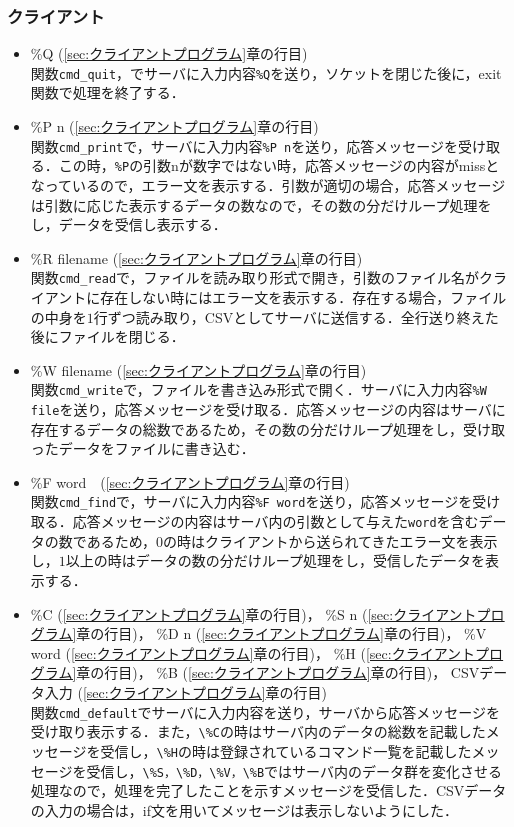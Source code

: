 \documentclass{jarticle}[11pt]
\begin{document}
\subsubsection{クライアント}
\begin{itemize}
\item \%Q (\ref{sec:クライアントプログラム}章の行目)\\
  関数\verb|cmd_quit|，でサーバに入力内容\verb|%Q|を送り，ソケットを閉じた後に，exit関数で処理を終了する．

\item \%P n (\ref{sec:クライアントプログラム}章の行目)\\
  関数\verb|cmd_print|で，サーバに入力内容\verb|%P n|を送り，応答メッセージを受け取る．この時，\verb|%P|の引数nが数字ではない時，応答メッセージの内容がmissとなっているので，エラー文を表示する．引数が適切の場合，応答メッセージは引数に応じた表示するデータの数なので，その数の分だけループ処理をし，データを受信し表示する．

\item \%R filename (\ref{sec:クライアントプログラム}章の行目)\\
関数\verb|cmd_read|で，ファイルを読み取り形式で開き，引数のファイル名がクライアントに存在しない時にはエラー文を表示する．存在する場合，ファイルの中身を$1$行ずつ読み取り，CSVとしてサーバに送信する．全行送り終えた後にファイルを閉じる．

\item \%W filename (\ref{sec:クライアントプログラム}章の行目)\\
関数\verb|cmd_write|で，ファイルを書き込み形式で開く．サーバに入力内容\verb|%W file|を送り，応答メッセージを受け取る．応答メッセージの内容はサーバに存在するデータの総数であるため，その数の分だけループ処理をし，受け取ったデータをファイルに書き込む．

\item \%F word　(\ref{sec:クライアントプログラム}章の行目)\\
関数\verb|cmd_find|で，サーバに入力内容\verb|%F word|を送り，応答メッセージを受け取る．応答メッセージの内容はサーバ内の引数として与えた\verb|word|を含むデータの数であるため，$0$の時はクライアントから送られてきたエラー文を表示し，$1$以上の時はデータの数の分だけループ処理をし，受信したデータを表示する．

\item \%C (\ref{sec:クライアントプログラム}章の行目)， \%S n (\ref{sec:クライアントプログラム}章の行目)， \%D n (\ref{sec:クライアントプログラム}章の行目)， \%V word (\ref{sec:クライアントプログラム}章の行目)， \%H (\ref{sec:クライアントプログラム}章の行目)， \%B (\ref{sec:クライアントプログラム}章の行目)， CSVデータ入力 (\ref{sec:クライアントプログラム}章の行目)\\
  関数\verb|cmd_default|でサーバに入力内容を送り，サーバから応答メッセージを受け取り表示する．また，\verb|\%C|の時はサーバ内のデータの総数を記載したメッセージを受信し，\verb|\%H|の時は登録されているコマンド一覧を記載したメッセージを受信し，\verb|\%S，\%D，\%V，\%B|ではサーバ内のデータ群を変化させる処理なので，処理を完了したことを示すメッセージを受信した．CSVデータの入力の場合は，if文を用いてメッセージは表示しないようにした．


\end{itemize}
\end{document}
